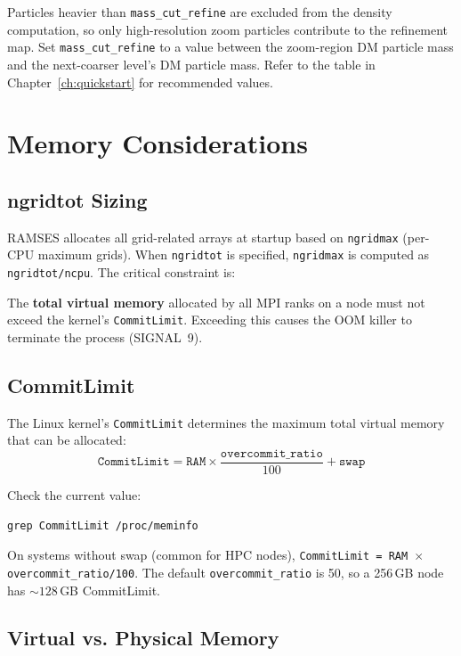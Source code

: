 \documentclass[11pt,fleqn]{book}
\begin{document}
Particles heavier than \texttt{mass\_cut\_refine} are excluded from the density computation, so only high-resolution zoom particles contribute to the refinement map. Set \texttt{mass\_cut\_refine} to a value between the zoom-region DM particle mass and the next-coarser level's DM particle mass. Refer to the table in Chapter~\ref{ch:quickstart} for recommended values.


\section{Memory Considerations}

\subsection{ngridtot Sizing}

RAMSES allocates all grid-related arrays at startup based on \texttt{ngridmax} (per-CPU maximum grids). When \texttt{ngridtot} is specified, \texttt{ngridmax} is computed as \texttt{ngridtot/ncpu}. The critical constraint is:

\begin{important}
The \textbf{total virtual memory} allocated by all MPI ranks on a node must not exceed the kernel's \texttt{CommitLimit}. Exceeding this causes the OOM killer to terminate the process (SIGNAL~9).
\end{important}

\subsection{CommitLimit}

The Linux kernel's \texttt{CommitLimit} determines the maximum total virtual memory that can be allocated:
\[
\texttt{CommitLimit} = \texttt{RAM} \times \frac{\texttt{overcommit\_ratio}}{100} + \texttt{swap}
\]

Check the current value:
\begin{codebox}
\begin{lstlisting}[style=bash,numbers=none]
grep CommitLimit /proc/meminfo
\end{lstlisting}
\end{codebox}

On systems without swap (common for HPC nodes), \texttt{CommitLimit = RAM $\times$ overcommit\_ratio/100}. The default \texttt{overcommit\_ratio} is 50, so a 256\,GB node has ${\sim}128$\,GB CommitLimit.

\subsection{Virtual vs. Physical Memory}
\end{document}
